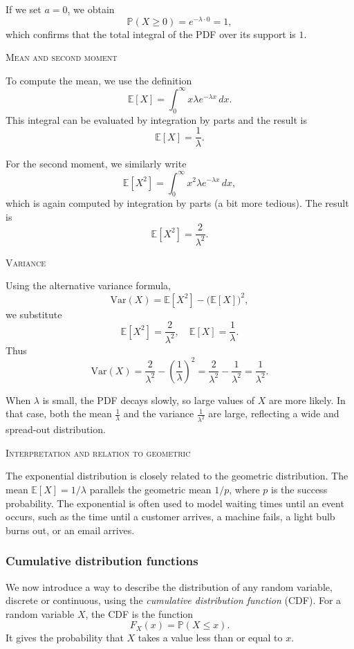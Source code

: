 If we set \(a = 0\), we obtain
\[
\mathbb{P}(X \ge 0) = e^{-\lambda \cdot 0} = 1,
\]
which confirms that the total integral of the PDF over its support is \(1\).

\bigskip\textsc{Mean and second moment}

To compute the mean, we use the definition
\[
\mathbb{E}[X] = \int_0^{\infty} x \lambda e^{-\lambda x} \, dx.
\]
This integral can be evaluated by integration by parts and the result is
\[
\mathbb{E}[X] = \frac{1}{\lambda}.
\]

For the second moment, we similarly write
\[
\mathbb{E}[X^2] = \int_0^{\infty} x^2 \lambda e^{-\lambda x} \, dx,
\]
which is again computed by integration by parts (a bit more tedious).  
The result is
\[
\mathbb{E}[X^2] = \frac{2}{\lambda^2}.
\]

\bigskip\textsc{Variance}

Using the alternative variance formula,
\[
\mathrm{Var}(X) = \mathbb{E}[X^2] - \big(\mathbb{E}[X]\big)^2,
\]
we substitute
\[
\mathbb{E}[X^2] = \frac{2}{\lambda^2},
\quad
\mathbb{E}[X] = \frac{1}{\lambda}.
\]
Thus
\[
\mathrm{Var}(X)
= \frac{2}{\lambda^2} - \left(\frac{1}{\lambda}\right)^2
= \frac{2}{\lambda^2} - \frac{1}{\lambda^2}
= \frac{1}{\lambda^2}.
\]

When \(\lambda\) is small, the PDF decays slowly, so large values of \(X\) are more likely.  
In that case, both the mean \(\frac{1}{\lambda}\) and the variance \(\frac{1}{\lambda^2}\) are large, reflecting a wide and spread-out distribution.  

\bigskip\textsc{Interpretation and relation to geometric}

The exponential distribution is closely related to the geometric distribution.  
The mean \(\mathbb{E}[X] = 1/\lambda\) parallels the geometric mean \(1/p\), where \(p\) is the success probability.  
The exponential is often used to model waiting times until an event occurs, such as the time until a customer arrives, a machine fails, a light bulb burns out, or an email arrives.


\subsubsection{Cumulative distribution functions}

We now introduce a way to describe the distribution of any random variable, discrete or continuous, using the \textit{cumulative distribution function} (CDF).  
For a random variable \(X\), the CDF is the function
\[
F_X(x) = \mathbb{P}(X \le x).
\]
It gives the probability that \(X\) takes a value less than or equal to \(x\).

